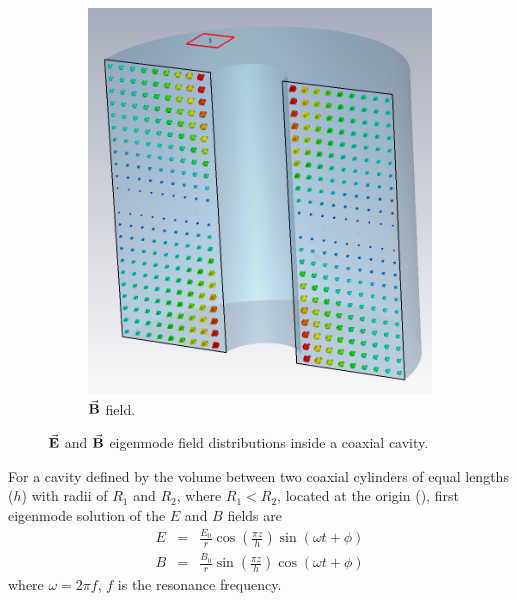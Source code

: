 \documentclass{article}
\begin{document}
\begin{figure}[H]
    \begin{subfigure}{0.45\textwidth}
        \centering
        \includegraphics[width=\linewidth]{../../../figures/cst/cavity_B_field_dist.png}
        \caption*{$\vec{\textbf{B}}$ field.}
    \end{subfigure}
    \caption{$\vec{\textbf{E}}$ and $\vec{\textbf{B}}$ eigenmode field distributions inside a coaxial cavity.}
    \label{fig:rhodo_cavity_field_dist}
\end{figure}
For a cavity defined by the volume between two coaxial cylinders of equal lengths ($h$) with radii of $R_1$ and $R_2$, where $R_1 < R_2$, located at the origin (),
first eigenmode solution of the $E$ and $B$ fields are \cite{rhodo_pottier}
\begin{eqnarray}
    E &=& \frac{E_0}{r} \cos(\frac{\pi z}{h}) \sin(\omega t + \phi) \\
    B &=& \frac{B_0}{r} \sin(\frac{\pi z}{h}) \cos(\omega t + \phi)
\end{eqnarray}
where $\omega=2\pi f$, $f$ is the resonance frequency.
\end{document}
